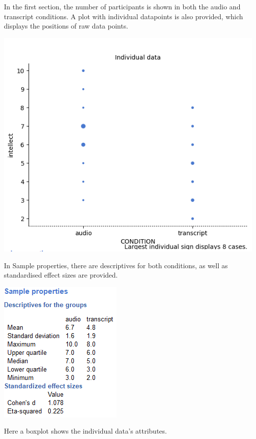 \documentclass[
]{book}
\begin{document}
In the first section, the number of participants is shown in both the audio and transcript conditions. A plot with individual datapoints is also provided, which displays the positions of raw data points.

\includegraphics{img/ch7/7.3comparegroups_plot.png}

In Sample properties, there are descriptives for both conditions, as well as standardised effect sizes are provided.

\includegraphics{img/ch7/7.3comparegroups_sp.png}

Here a boxplot shows the individual data's attributes.
\end{document}
